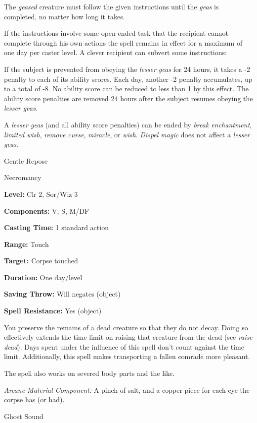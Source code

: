 \documentclass{article}
\begin{document}
The \textit{geased }creature must follow the given instructions until the \textit{geas 
}is completed, no matter how long it takes.

If the instructions involve some open-ended task that the recipient cannot complete 
through his own actions the spell remains in effect for a maximum of one day per 
caster level. A clever recipient can subvert some instructions:

If the subject is prevented from obeying the \textit{lesser geas }for 24 hours, 
it takes a -2 penalty to each of its ability scores. Each day, another -2 penalty 
accumulates, up to a total of -8. No ability score can be reduced to less than 
1 by this effect. The ability score penalties are removed 24 hours after the subject 
resumes obeying the \textit{lesser geas.}

A \textit{lesser geas }(and all ability score penalties) can be ended by \textit{break 
enchantment}, \textit{limited wish}, \textit{remove curse}, \textit{miracle}, or 
\textit{wish}. \textit{Dispel magic }does not affect a \textit{lesser geas}.

\vspace{12pt}
Gentle Repose

Necromancy

\textbf{Level:} Clr 2, Sor/Wiz 3

\textbf{Components:} V, S, M/DF

\textbf{Casting Time:} 1 standard action

\textbf{Range:} Touch

\textbf{Target:} Corpse touched

\textbf{Duration:} One day/level

\textbf{Saving Throw: }Will negates (object)

\textbf{Spell Resistance:} Yes (object)

You preserve the remains of a dead creature so that they do not decay. Doing so 
effectively extends the time limit on raising that creature from the dead (see 
\textit{raise dead}). Days spent under the influence of this spell don't count 
against the time limit. Additionally, this spell makes transporting a fallen comrade 
more pleasant.

The spell also works on severed body parts and the like.

\textit{Arcane Material Component: }A pinch of salt, and a copper piece for each 
eye the corpse has (or had).

\vspace{12pt}
Ghost Sound
\end{document}
